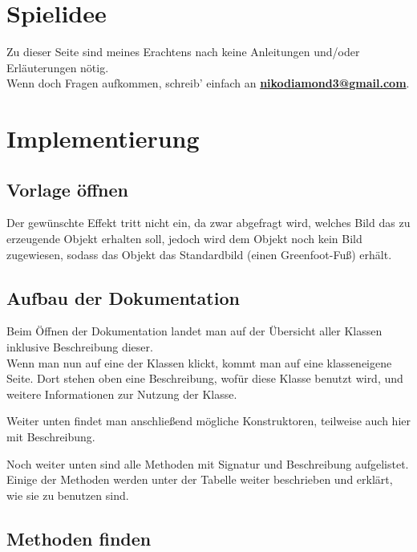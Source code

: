 \documentclass{scrartcl}   %
\begin{document}
\cleardoublepage

\section{Spielidee}

Zu dieser Seite sind meines Erachtens nach keine Anleitungen und/oder Erläuterungen nötig.\\
Wenn doch Fragen aufkommen, schreib' einfach an \textbf{\href{mailto:nikodiamond3@gmail.com}{nikodiamond3@gmail.com}}.

\newpage

\section{Implementierung}

\subsection{Vorlage öffnen}

Der gewünschte Effekt tritt nicht ein, da zwar abgefragt wird, welches Bild das zu erzeugende Objekt erhalten soll, jedoch wird dem Objekt noch kein Bild zugewiesen, sodass das Objekt das Standardbild (einen Greenfoot-Fuß) erhält.

\subsection{Aufbau der Dokumentation}

Beim Öffnen der Dokumentation landet man auf der Übersicht aller Klassen inklusive Beschreibung dieser.\\
Wenn man nun auf eine der Klassen klickt, kommt man auf eine klasseneigene Seite. Dort stehen oben eine Beschreibung, wofür diese Klasse benutzt wird, und weitere Informationen zur Nutzung der Klasse.

Weiter unten findet man anschließend mögliche Konstruktoren, teilweise auch hier mit Beschreibung.

Noch weiter unten sind alle Methoden mit Signatur und Beschreibung aufgelistet. Einige der Methoden werden unter der Tabelle weiter beschrieben und erklärt, wie sie zu benutzen sind.

\subsection{Methoden finden}
\end{document}
